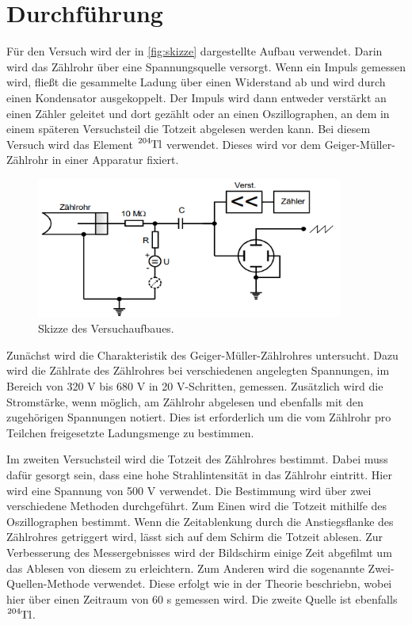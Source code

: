 \section{Durchführung}
\label{sec:Durchführung}
Für den Versuch wird der in \autoref{fig:skizze} dargestellte Aufbau verwendet. Darin wird das Zählrohr über eine Spannungsquelle
versorgt. Wenn ein Impuls gemessen wird, fließt die gesammelte Ladung über einen Widerstand ab und wird durch einen Kondensator
ausgekoppelt. Der Impuls wird dann entweder verstärkt an einen Zähler geleitet und dort gezählt oder an einen Oszillographen, an dem
in einem späteren Versuchsteil die Totzeit abgelesen werden kann. Bei diesem Versuch wird das Element $\ce{^{204}Tl}$ verwendet. Dieses
wird vor dem Geiger-Müller-Zählrohr in einer Apparatur fixiert.
\begin{figure}
    \centering
    \includegraphics[width=0.9\textwidth]{content/skizze.png}
    \caption{Skizze des Versuchaufbaues.}
    \label{fig:skizze}
\end{figure}

Zunächst wird die Charakteristik des Geiger-Müller-Zählrohres untersucht. Dazu wird die Zählrate des Zählrohres bei verschiedenen
angelegten Spannungen, im Bereich von 320 V bis 680 V in 20 V-Schritten, gemessen. Zusätzlich wird die Stromstärke, wenn möglich, am
Zählrohr abgelesen und ebenfalls mit den zugehörigen Spannungen notiert. Dies ist erforderlich um die vom Zählrohr pro Teilchen
freigesetzte Ladungsmenge zu bestimmen.

Im zweiten Versuchsteil wird die Totzeit des Zählrohres bestimmt. Dabei muss dafür gesorgt sein, dass eine
hohe Strahlintensität in das Zählrohr eintritt. Hier wird eine Spannung von 500 V verwendet.
Die Bestimmung wird über zwei verschiedene Methoden durchgeführt. 
Zum Einen wird die Totzeit mithilfe des Oszillographen bestimmt. Wenn die Zeitablenkung durch die Anstiegsflanke des Zählrohres
getriggert wird, lässt sich auf dem Schirm die Totzeit ablesen. Zur Verbesserung des Messergebnisses wird der Bildschirm einige Zeit
abgefilmt um das Ablesen von diesem zu erleichtern. Zum Anderen wird die sogenannte Zwei-Quellen-Methode verwendet. Diese erfolgt wie
in der Theorie beschriebn, wobei hier 
über einen Zeitraum von 60 s gemessen wird. Die zweite Quelle ist ebenfalls $\ce{^{204}Tl}$.

